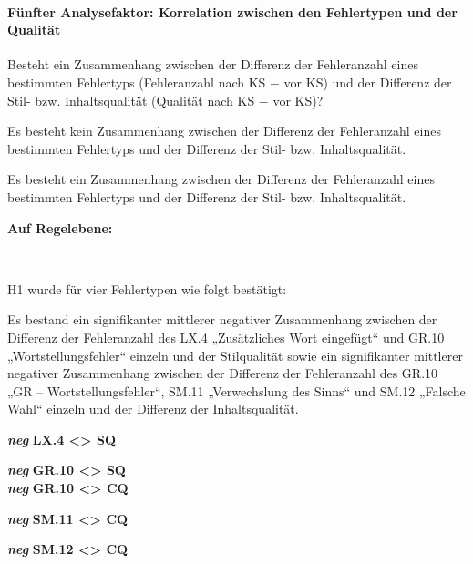 \paragraph*{Fünfter Analysefaktor: Korrelation zwischen den Fehlertypen und der Qualität}
\begin{description}[font=\normalfont\bfseries]
\item [Fragestellung:] Besteht ein Zusammenhang zwischen der Differenz der Fehleranzahl eines bestimmten Fehlertyps (Fehleranzahl nach KS $-$ vor KS) und der Differenz der Stil- bzw. Inhaltsqualität (Qualität nach KS $-$ vor KS)?
\item [H0 --] Es besteht kein Zusammenhang zwischen der Differenz der Fehleranzahl eines bestimmten Fehlertyps und der Differenz der Stil- bzw. Inhaltsqualität.
\item [H1 --] Es besteht ein Zusammenhang zwischen der Differenz der Fehleranzahl eines bestimmten Fehlertyps und der Differenz der Stil- bzw. Inhaltsqualität.
\item [Resultat]
\end{description}
\noindent
\parbox[t]{.7\textwidth}{\textbf{Auf Regelebene:}}\\
\parbox[t]{.7\textwidth}{
H1 wurde für vier Fehlertypen wie folgt bestätigt:

Es bestand ein signifikanter mittlerer negativer Zusammenhang zwischen der Differenz der Fehleranzahl des LX.4 „Zusätzliches Wort eingefügt“ und GR.10 „Wortstellungsfehler“ einzeln und der Stilqualität sowie ein signifikanter mittlerer negativer Zusammenhang zwischen der Differenz der Fehleranzahl des GR.10 „GR – Wortstellungsfehler“, SM.11 „Verwechslung des Sinns“ und SM.12 „Falsche Wahl“ einzeln und der Differenz der Inhaltsqualität.
\newpage
}
\parbox[t]{.04\textwidth}{}
\colorbox{smGreen}{\parbox[t]{.25\textwidth}{
{ \textbf{\textit{neg}} \textbf{LX.4 <> SQ}}

{ \textbf{\textit{neg}} \textbf{GR.10 <> SQ}}\\

{ \textbf{\textit{neg}} \textbf{GR.10 <> CQ}}

{ \textbf{\textit{neg}} \textbf{SM.11 <> CQ}}

 \textbf{\textit{neg}} \textbf{SM.12 <> CQ}\\
 \\
 \\
 \\
}}

